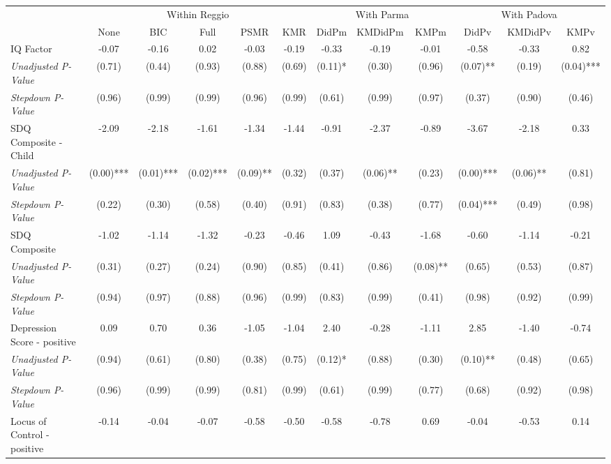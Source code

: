 \begin{tabular}{l c c c c c c c c c c c}
\toprule
& \multicolumn{5}{c}{Within Reggio} & \multicolumn{3}{c}{With Parma} & \multicolumn{3}{c}{With Padova} \\\cmidrule(lr){2-6} \cmidrule(lr){7-9} \cmidrule(lr){10-12}
 & None & BIC & Full & PSMR & KMR & DidPm & KMDidPm & KMPm & DidPv & KMDidPv & KMPv \\
\midrule
IQ Factor & -0.07 & -0.16 & 0.02 & -0.03 & -0.19 & -0.33 & -0.19 & -0.01 & -0.58 & -0.33 & 0.82 \\
\quad \textit{Unadjusted P-Value} & (0.71) & (0.44) & (0.93) & (0.88) & (0.69) & (0.11)* & (0.30) & (0.96) & (0.07)** & (0.19) & (0.04)*** \\
\quad \textit{Stepdown P-Value} & (0.96) & (0.99) & (0.99) & (0.96) & (0.99) & (0.61) & (0.99) & (0.97) & (0.37) & (0.90) & (0.46) \\
SDQ Composite - Child & -2.09 & -2.18 & -1.61 & -1.34 & -1.44 & -0.91 & -2.37 & -0.89 & -3.67 & -2.18 & 0.33 \\
\quad \textit{Unadjusted P-Value} & (0.00)*** & (0.01)*** & (0.02)*** & (0.09)** & (0.32) & (0.37) & (0.06)** & (0.23) & (0.00)*** & (0.06)** & (0.81) \\
\quad \textit{Stepdown P-Value} & (0.22) & (0.30) & (0.58) & (0.40) & (0.91) & (0.83) & (0.38) & (0.77) & (0.04)*** & (0.49) & (0.98) \\
SDQ Composite & -1.02 & -1.14 & -1.32 & -0.23 & -0.46 & 1.09 & -0.43 & -1.68 & -0.60 & -1.14 & -0.21 \\
\quad \textit{Unadjusted P-Value} & (0.31) & (0.27) & (0.24) & (0.90) & (0.85) & (0.41) & (0.86) & (0.08)** & (0.65) & (0.53) & (0.87) \\
\quad \textit{Stepdown P-Value} & (0.94) & (0.97) & (0.88) & (0.96) & (0.99) & (0.83) & (0.99) & (0.41) & (0.98) & (0.92) & (0.99) \\
Depression Score - positive & 0.09 & 0.70 & 0.36 & -1.05 & -1.04 & 2.40 & -0.28 & -1.11 & 2.85 & -1.40 & -0.74 \\
\quad \textit{Unadjusted P-Value} & (0.94) & (0.61) & (0.80) & (0.38) & (0.75) & (0.12)* & (0.88) & (0.30) & (0.10)** & (0.48) & (0.65) \\
\quad \textit{Stepdown P-Value} & (0.96) & (0.99) & (0.99) & (0.81) & (0.99) & (0.61) & (0.99) & (0.77) & (0.68) & (0.92) & (0.98) \\
Locus of Control - positive & -0.14 & -0.04 & -0.07 & -0.58 & -0.50 & -0.58 & -0.78 & 0.69 & -0.04 & -0.53 & 0.14 \\

\end{tabular}

